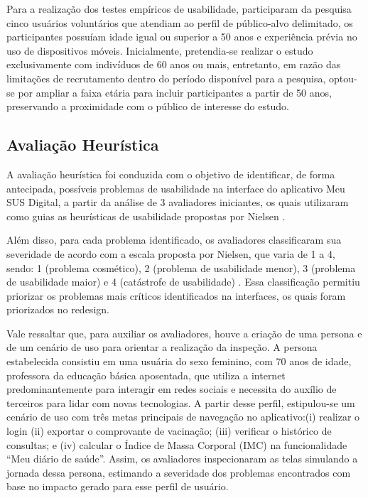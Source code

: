 \documentclass[12pt]{article}
\begin{document}
\begin{abstractp}
Para a realização dos testes empíricos de usabilidade, participaram da pesquisa cinco usuários voluntários que atendiam ao perfil de público-alvo delimitado, os participantes possuíam idade igual ou superior a 50 anos e experiência prévia no uso de dispositivos móveis. Inicialmente, pretendia-se realizar o estudo exclusivamente com indivíduos de 60 anos ou mais, entretanto, em razão das limitações de recrutamento dentro do período disponível para a pesquisa, optou-se por ampliar a faixa etária para incluir participantes a partir de 50 anos, preservando a proximidade com o público de interesse do estudo.

\subsection{Avaliação Heurística}
\label{sec:avaliacao_heuristica}

A avaliação heurística foi conduzida com o objetivo de identificar, de forma antecipada, possíveis problemas de usabilidade na interface do aplicativo Meu SUS Digital, a partir da análise de 3 avaliadores iniciantes, os quais utilizaram como guias as heurísticas de usabilidade propostas por Nielsen \cite{nielsen1994heuristic}.

Além disso, para  cada problema identificado, os avaliadores classificaram sua severidade de acordo com a escala proposta por Nielsen, que varia de 1 a 4, sendo:  1 (problema cosmético), 2 (problema de usabilidade menor), 3 (problema de usabilidade maior) e 4 (catástrofe de usabilidade) \cite{nielsen1994heuristic}. Essa classificação permitiu priorizar os problemas mais críticos identificados na interfaces, os quais foram priorizados no redesign. 

Vale ressaltar que, para auxiliar os avaliadores, houve a criação de uma persona e de um cenário de uso para orientar a realização da inspeção. A persona estabelecida consistiu em uma usuária do sexo feminino, com 70 anos de idade, professora da educação básica aposentada, que utiliza a internet predominantemente para interagir em redes sociais e necessita do auxílio de terceiros para lidar com novas tecnologias. A partir desse perfil, estipulou-se um cenário de uso com três metas principais de navegação no aplicativo:(i) realizar o login  (ii) exportar o comprovante de vacinação; (iii) verificar o histórico de consultas; e (iv) calcular o Índice de Massa Corporal (IMC) na funcionalidade ``Meu diário de saúde''. Assim, os avaliadores inspecionaram as telas simulando a jornada dessa persona, estimando a severidade dos problemas encontrados com base no impacto gerado para esse perfil de usuário.


\end{abstractp}
\end{document}
